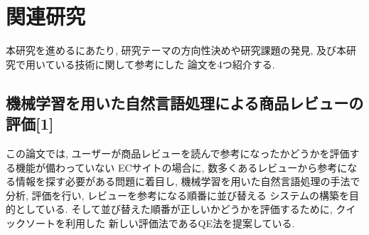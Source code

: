 \documentclass{ltjarticle}
\begin{document}
\newpage
\section{関連研究}
本研究を進めるにあたり, 研究テーマの方向性決めや研究課題の発見, 及び本研究で用いている技術に関して参考にした
論文を4つ紹介する. 
\subsection{機械学習を用いた自然言語処理による商品レビューの評価[1]}
この論文では, ユーザーが商品レビューを読んで参考になったかどうかを評価する機能が備わっていない
ECサイトの場合に, 数多くあるレビューから参考になる情報を探す必要がある問題に着目し, 
機械学習を用いた自然言語処理の手法で分析, 評価を行い, レビューを参考になる順番に並び替える
システムの構築を目的としている. そして並び替えた順番が正しいかどうかを評価するために, クイックソートを利用した
新しい評価法であるQE法を提案している. 
\end{document}
